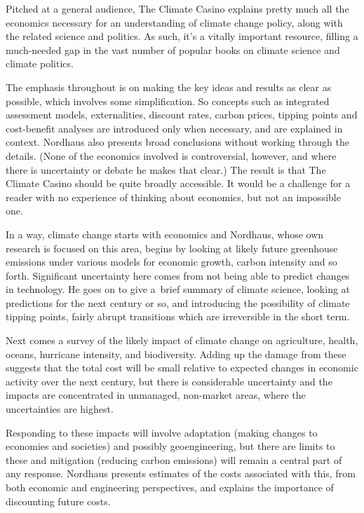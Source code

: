 \newpage\nuluj
\pagestyle{nordhaus}


Pitched at a general audience, The Climate Casino explains pretty much all the economics necessary for an understanding of climate change policy, along with the related science and politics. As such, it's a vitally important resource, filling a much-needed gap in the vast number of popular books on climate science and climate politics.

The emphasis throughout is on making the key ideas and results as clear as possible, which involves some simplification. So concepts such as integrated assessment models, externalities, discount rates, carbon prices, tipping points and cost-benefit analyses are introduced only when necessary, and are explained in context. Nordhaus also presents broad conclusions without working through the details. (None of the economics involved is controversial, however, and where there is uncertainty or debate he makes that clear.) The result is that The Climate Casino should be quite broadly accessible. It would be a challenge for a reader with no experience of thinking about economics, but not an impossible one. 

In a way, climate change starts with economics and Nordhaus, whose own research is focused on this area, begins by looking at likely future greenhouse emissions under various models for economic growth, carbon intensity and so forth. Significant uncertainty here comes from not being able to predict changes in technology. He goes on to give a~brief summary of climate science, looking at predictions for the next century or so, and introducing the possibility of climate tipping points, fairly abrupt transitions which are irreversible in the short term. 

Next comes a survey of the likely impact of climate change on agriculture, health, oceans, hurricane intensity, and biodiversity. Adding up the damage from these suggests that the total cost will be small relative to expected changes in economic activity over the next century, but there is considerable uncertainty and the impacts are concentrated in unmanaged, non-market areas, where the uncertainties are highest. 

Responding to these impacts will involve adaptation (making changes to economies and societies) and possibly geoengineering, but there are limits to these and mitigation (reducing carbon emissions) will remain a central part of any response. Nordhaus presents estimates of the costs associated with this, from both economic and engineering perspectives, and explains the importance of discounting future costs. 

